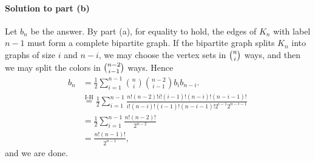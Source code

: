 \paragraph{Solution to part (b)}     Let $b_n$ be the answer. By part (a), for equality to hold, the edges of $K_n$ with label $n-1$ must form a complete bipartite graph. If the bipartite graph splits $K_n$ into graphs of size $i$ and $n-i$, we may choose the vertex sets in $\tbinom ni$ ways, and then we may split the colors in $\tbinom{n-2}{i-1}$ ways. Hence
\begin{align*}
    b_n&=\frac12\sum_{i=1}^{n-1}\binom ni\binom{n-2}{i-1}b_ib_{n-i}.\\
    &\stackrel{\text{I-H}}=\frac12\sum_{i=1}^{n-1}\frac{n!(n-2)!i!(i-1)!(n-i)!(n-i-1)!}{i!(n-i)!(i-1)!(n-i-1)!2^{i-1}2^{n-i-1}}\\
    &=\frac12\sum_{i=1}^{n-1}\frac{n!(n-2)!}{2^{n-2}}\\
    &=\frac{n!(n-1)!}{2^{n-1}},
\end{align*}
and we are done.

